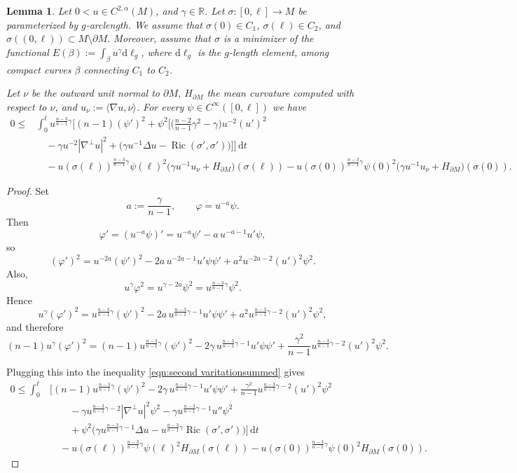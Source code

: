 \documentclass[12pt,a4paper,reqno]{amsart}
\newtheorem{lemma}{Lemma}
\theoremstyle{definition}
\renewcommand{\leq}{\leqslant}
\DeclareMathOperator{\Ric}{Ric}
\begin{document}
{\begin{lemma}
    Let $0<u\in C^{2,\alpha}(M)$, and $\gamma\in\mathbb R$. Let $\sigma:[0,\ell]\to M$ be parameterized by $g$-arclength.  We assume that $\sigma(0)\in C_1$, $\sigma(\ell)\in C_2$, and $\sigma((0,\ell))\subset M\setminus\partial M$. Moreover, assume that $\sigma$ is a minimizer of the functional $E(\beta):=\int_\beta u^\gamma \mathrm{d}\ell_g$, where $\mathrm{d}\ell_g$ is the $g$-length element, among compact curves $\beta$ connecting $C_1$ to $C_2$.  
    
    Let $\nu$ be the outward unit normal to $\partial M$, $H_{\partial M}$ the mean curvature computed with respect to $\nu$, and $u_{\nu}:=\langle \nabla u,\nu\rangle$. For every $\psi\in C^\infty([0,\ell])$  we have 
    \begin{align*}
    0\leq &\int_0^\ell u^{\frac{n-3}{n-1}\gamma}\Big[
(n-1)(\psi')^2 
+\psi^2\Big[\Big(\frac{n-2}{n-1}\gamma^2-\gamma\Big)
u^{-2}(u')^2 \\
&\quad 
-\gamma u^{-2}|\nabla^\perp u|^2
+\Big(\gamma u^{-1}\Delta u
-\Ric(\sigma',\sigma')\Big)
\Big]\Big]\,\mathrm{d}t \\
&\quad
-u(\sigma(\ell))^{\frac{n-3}{n-1}\gamma}\psi(\ell)^2
\bigl(\gamma u^{-1}u_\nu+H_{\partial M}\bigr)(\sigma(\ell))
-
u(\sigma(0))^{\frac{n-3}{n-1}\gamma}\psi(0)^2
\bigl(\gamma u^{-1}u_\nu+H_{\partial M}\bigr)(\sigma(0)).
    \end{align*}
\end{lemma}
\begin{proof}
    Set
\[
a:=\frac{\gamma}{n-1},
\qquad
\varphi=u^{-a}\psi.
\]
Then
\[
\varphi'=(u^{-a}\psi)'=u^{-a}\psi'-a\,u^{-a-1}u'\psi,
\]
so
\[
(\varphi')^2
=
u^{-2a}(\psi')^2-2a\,u^{-2a-1}u'\psi\psi'
+a^2u^{-2a-2}(u')^2\psi^2.
\]
Also,
\[
u^\gamma\varphi^2=u^{\gamma-2a}\psi^2
=
u^{\frac{n-3}{n-1}\gamma}\psi^2.
\]
Hence
\[
u^\gamma(\varphi')^2
=
u^{\frac{n-3}{n-1}\gamma}(\psi')^2
-2a\,u^{\frac{n-3}{n-1}\gamma-1}u'\psi\psi'
+a^2u^{\frac{n-3}{n-1}\gamma-2}(u')^2\psi^2,
\]
and therefore
\[
(n-1)u^\gamma(\varphi')^2
=
(n-1)u^{\frac{n-3}{n-1}\gamma}(\psi')^2
-2\gamma\,u^{\frac{n-3}{n-1}\gamma-1}u'\psi\psi'
+\frac{\gamma^2}{n-1}u^{\frac{n-3}{n-1}\gamma-2}(u')^2\psi^2.
\]

Plugging this into the inequality \eqref{eqn:second varitationsummed} gives
\begin{align*}
0\leq \int_0^\ell &\Big[
(n-1)u^{\frac{n-3}{n-1}\gamma}(\psi')^2
-2\gamma\,u^{\frac{n-3}{n-1}\gamma-1}u'\psi\psi'
+\frac{\gamma^2}{n-1}u^{\frac{n-3}{n-1}\gamma-2}(u')^2\psi^2 \\
&\qquad
-\gamma u^{\frac{n-3}{n-1}\gamma-2}|\nabla^\perp u|^2\psi^2
-\gamma u^{\frac{n-3}{n-1}\gamma-1}u''\psi^2 \\
&\qquad
+\psi^2\Big(\gamma u^{\frac{n-3}{n-1}\gamma-1}\Delta u
-u^{\frac{n-3}{n-1}\gamma}\Ric(\sigma',\sigma')\Big)
\Big]\,\mathrm{d}t \\
&\quad
-u(\sigma(\ell))^{\frac{n-3}{n-1}\gamma}\psi(\ell)^2H_{\partial M}(\sigma(\ell))
-u(\sigma(0))^{\frac{n-3}{n-1}\gamma}\psi(0)^2H_{\partial M}(\sigma(0)).
\end{align*}


\end{proof}}
\end{document}
